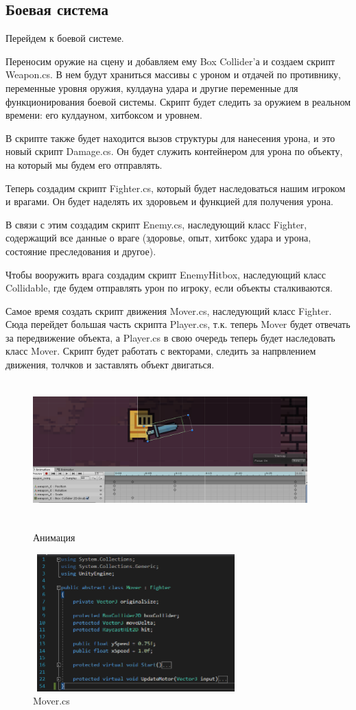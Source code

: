 \documentclass[a4paper,12pt]{article}
\begin{document}
\newpage
\subsection{Боевая система}
Перейдем к боевой системе.

Переносим оружие на сцену и добавляем ему Box Collider'а и создаем скрипт Weapon.cs. В нем будут храниться массивы с уроном и отдачей по противнику, переменные уровня оружия, кулдауна удара и другие переменные для функционирования боевой системы. Скрипт будет следить за оружием в реальном времени: его кулдауном, хитбоксом и уровнем.

В скрипте также будет находится вызов структуры для нанесения урона, и это новый скрипт Damage.cs. Он будет служить контейнером для урона по объекту, на который мы будем его отправлять.

Теперь создадим скрипт Fighter.cs, который будет наследоваться нашим игроком и врагами. Он будет наделять их здоровьем и функцией для получения урона.

В связи с этим создадим скрипт Enemy.cs, наследующий класс Fighter, содержащий все данные о враге (здоровье, опыт, хитбокс удара и урона, состояние преследования и другое).

Чтобы вооружить врага создадим скрипт EnemyHitbox, наследующий класс Collidable, где будем отправлять урон по игроку, если объекты сталкиваются.

Самое время создать скрипт движения Mover.cs, наследующий класс Fighter. Сюда перейдет большая часть скрипта Player.cs, т.к. теперь Mover будет отвечать за передвижение объекта, а Player.cs в свою очередь теперь будет наследовать класс Mover. Скрипт будет работать с векторами, следить за напрвлением движения, толчков и заставлять объект двигаться.

\newpage
\begin{figure}[h!]
\centering
\includegraphics[width = 400px, height=200px]{pictures/anim.png}
\caption{Анимация}
\vspace{5mm}
\includegraphics[width = 300px, height=200px]{pictures/mover.png}
\caption{Mover.cs}
\end{figure}
\end{document}
